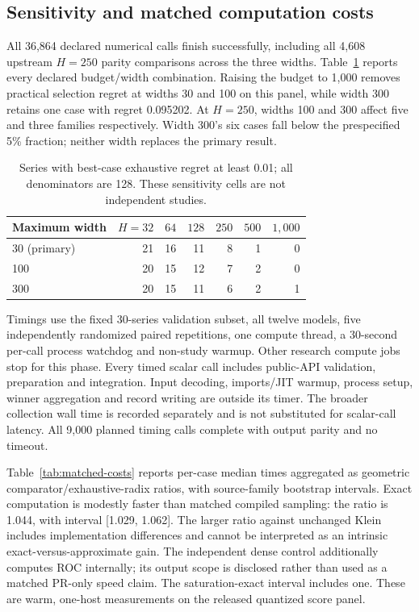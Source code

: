 
\subsection{Sensitivity and matched computation costs}
All 36,864 declared numerical calls finish successfully, including all
4,608 upstream $H=250$ parity comparisons across the three widths.
Table~\ref{tab:budget-sensitivity} reports every declared budget/width
combination. Raising the budget to 1,000 removes practical selection
regret at widths 30 and 100 on this panel, while width 300 retains one
case with regret 0.095202. At $H=250$, widths 100 and 300 affect five
and three families respectively. Width 300's six cases fall below the
prespecified 5\% fraction; neither width replaces the primary result.

\begin{table}[t]
\caption{Series with best-case exhaustive regret at least 0.01; all
denominators are 128. These sensitivity cells are not independent studies.}
\label{tab:budget-sensitivity}

\centering\small
\begin{tabular}{lrrrrrr}
\toprule
Maximum width & $H=32$ & $64$ & $128$ & $250$ & $500$ & $1{,}000$\\
\midrule
30 (primary) & 21 & 16 & 11 & 8 & 1 & 0\\
100 & 20 & 15 & 12 & 7 & 2 & 0\\
300 & 20 & 15 & 11 & 6 & 2 & 1\\
\bottomrule
\end{tabular}

\end{table}

Timings use the fixed 30-series validation subset, all twelve models,
five independently randomized paired repetitions, one compute thread,
a 30-second per-call process watchdog and non-study warmup. Other
research compute jobs stop for this phase. Every timed scalar call includes
public-API validation, preparation and integration. Input decoding,
imports/JIT warmup, process setup, winner aggregation and record writing
are outside its timer. The broader collection wall time is recorded
separately and is not substituted for scalar-call latency. All 9,000
planned timing calls complete with output parity and no timeout.

Table~\ref{tab:matched-costs} reports per-case median times aggregated as
geometric comparator/exhaustive-radix ratios, with source-family bootstrap
intervals. Exact computation is modestly faster than matched compiled
sampling: the ratio is 1.044, with interval [1.029, 1.062]. The larger
ratio against unchanged Klein includes implementation differences and
cannot be interpreted as an intrinsic exact-versus-approximate gain.
The independent dense control additionally computes ROC internally;
its output scope is disclosed rather than used as a matched PR-only
speed claim. The saturation-exact interval includes one. These are warm,
one-host measurements on the released quantized score panel.

